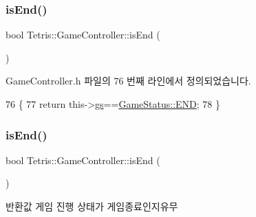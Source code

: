 \mbox{\label{class_tetris_1_1_game_controller_a0fa9ec1dd636ecc916cd4460e14781c4}} 
\subsubsection{\texorpdfstring{is\+End()}{isEnd()}\hspace{0.1cm}{\footnotesize\ttfamily [1/2]}}
{\footnotesize\ttfamily bool Tetris\+::\+Game\+Controller\+::is\+End (\begin{DoxyParamCaption}{ }\end{DoxyParamCaption})\hspace{0.3cm}{\ttfamily [inline]}}



Game\+Controller.\+h 파일의 76 번째 라인에서 정의되었습니다.


\begin{DoxyCode}
76                     \{
77             \textcolor{keywordflow}{return} this->\hyperlink{class_tetris_1_1_game_controller_ae4c894005a82404c73a5a9a6efb208dc}{gs}==\hyperlink{class_tetris_1_1_game_controller_a96a963b56385f3b3a122ff0ca2beb770ab1a326c06d88bf042f73d70f50197905}{GameStatus::END};
78         \}
\end{DoxyCode}
\mbox{\label{class_tetris_1_1_game_controller_a0fa9ec1dd636ecc916cd4460e14781c4}} 
\subsubsection{\texorpdfstring{is\+End()}{isEnd()}\hspace{0.1cm}{\footnotesize\ttfamily [2/2]}}
{\footnotesize\ttfamily bool Tetris\+::\+Game\+Controller\+::is\+End (\begin{DoxyParamCaption}{ }\end{DoxyParamCaption})\hspace{0.3cm}{\ttfamily [inline]}}

\begin{DoxyReturn}{반환값}
게임 진행 상태가 게임종료인지유무 
\end{DoxyReturn}


